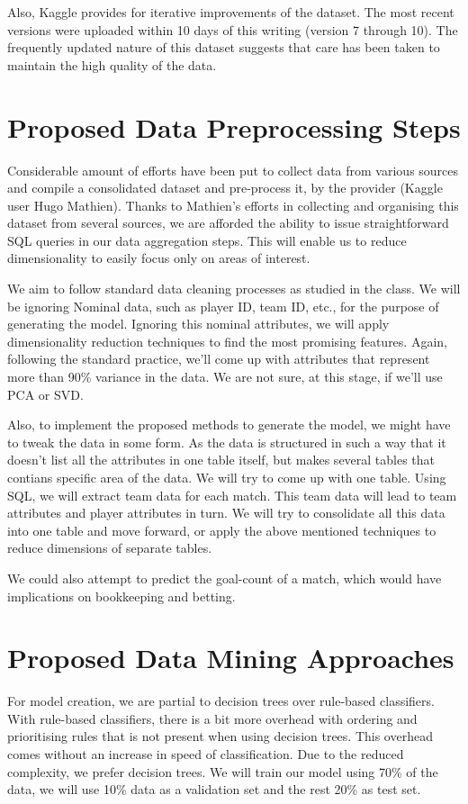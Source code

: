 \documentclass[11pt, letterpaper]{article}
\begin{document}
Also, Kaggle provides for iterative improvements of the dataset.
The most recent versions were uploaded within 10 days of this writing (version 7 through 10).
The frequently updated nature of this dataset suggests that care has been taken to maintain the high quality of the data.

\section*{Proposed Data Preprocessing Steps}
Considerable amount of efforts have been put to collect data from various sources and compile a consolidated dataset and pre-process it, by the provider (Kaggle user Hugo Mathien).
Thanks to Mathien's efforts in collecting and organising this dataset from several sources, we are afforded the ability to issue straightforward SQL queries in our data aggregation steps.
This will enable us to reduce dimensionality to easily focus only on areas of interest.

We aim to follow standard data cleaning processes as studied in the class.
We will be ignoring Nominal data, such as player ID, team ID, etc., for the purpose of generating the model.
Ignoring this nominal attributes, we will apply dimensionality reduction techniques to find the most promising features.
Again, following the standard practice, we'll come up with attributes that represent more than 90\% variance in the data.
We are not sure, at this stage, if we'll use PCA or SVD.

Also, to implement the proposed methods to generate the model, we might have to tweak the data in some form.
As the data is structured in such a way that it doesn't list all the attributes in one table itself, but makes several tables that contians specific area of the data.
We will try to come up with one table.
Using SQL, we will extract team data for each match.
This team data will lead to team attributes and player attributes in turn.
We will try to consolidate all this data into one table and move forward, or apply the above mentioned techniques to reduce dimensions of separate tables.

We could also attempt to predict the goal-count of a match, which would have implications on bookkeeping and betting.

\section*{Proposed Data Mining Approaches}
For model creation, we are partial to decision trees over rule-based classifiers.
With rule-based classifiers, there is a bit more overhead with ordering and prioritising rules that is not present when using decision trees. 
This overhead comes without an increase in speed of classification. Due to the reduced complexity, we prefer decision trees. 
We will train our model using 70\% of the data, we will use 10\% data as a validation set and the rest 20\% as test set. 
\end{document}
